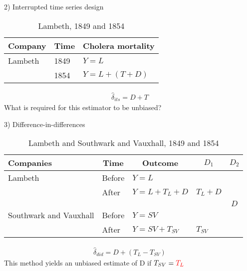 \documentclass{beamer}
\begin{document}
\begin{frame}{2) Interrupted time series design}

	\begin{table}\centering
		\caption{Lambeth, 1849 and 1854}
		\begin{center}
		\begin{tabular}{lll}
		\toprule
		\multicolumn{1}{l}{\textbf{Company}}&
		\multicolumn{1}{c}{\textbf{Time}}&
		\multicolumn{1}{c}{\textbf{Cholera mortality}}\\
		\midrule
		Lambeth & 1849 & $Y=L$ \\
		& 1854 & $Y=L + (T + D)$ \\
		\bottomrule
		\end{tabular}
		\end{center}
	\end{table}

\begin{eqnarray*}
\widehat{\delta}_{its} = D + T
\end{eqnarray*}What is required for this estimator to be unbiased?


\end{frame}

\begin{frame}{3) Difference-in-differences}

\begin{table}\centering
		\caption{Lambeth and Southwark and Vauxhall, 1849 and 1854}
		\begin{center}
		\begin{tabular}{lll|lc}
		\toprule
		\multicolumn{1}{l}{\textbf{Companies}}&
		\multicolumn{1}{c}{\textbf{Time}}&
		\multicolumn{1}{c}{\textbf{Outcome}}&
		\multicolumn{1}{c}{$D_1$}&
		\multicolumn{1}{c}{$D_2$}\\
		\midrule
		Lambeth & Before & $Y=L$ \\
		& After & $Y=L + T_L + D$ & $T_L+D$\\
		\midrule
		& & & & $D$ \\
		\midrule
		Southwark and Vauxhall & Before & $Y=SV$ \\
		& After & $Y=SV + T_{SV}$ & $T_{SV}$\\
		\bottomrule
		\end{tabular}
		\end{center}
	\end{table}

\begin{eqnarray*}
\widehat{\delta}_{did} = D + (T_L - T_{SV})
\end{eqnarray*}This method yields an unbiased estimate of D if $T_{SV} = \textcolor{red}{T_L}$

\end{frame}
\end{document}
